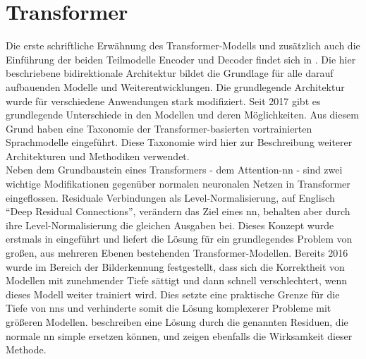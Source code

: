 \section{Transformer}\label{sec:transformer}
%
Die erste schriftliche Erwähnung des Transformer-Modells und zusätzlich auch die Einführung der beiden Teilmodelle Encoder und Decoder findet sich in \citet{attention}.
Die hier beschriebene bidirektionale Architektur bildet die Grundlage für alle darauf aufbauenden Modelle und Weiterentwicklungen.
Die grundlegende Architektur wurde für verschiedene Anwendungen stark modifiziert.
Seit 2017 gibt es grundlegende Unterschiede in den Modellen und deren Möglichkeiten.
Aus diesem Grund haben \citet{ammus} eine Taxonomie der Transformer-basierten vortrainierten Sprachmodelle eingeführt.
Diese Taxonomie wird hier zur Beschreibung weiterer Architekturen und Methodiken verwendet.\\

Neben dem Grundbaustein eines Transformers - dem Attention-\ac{nn} - sind zwei wichtige Modifikationen gegenüber normalen neuronalen Netzen in Transformer eingeflossen.
Residuale Verbindungen als Level-Normalisierung, auf Englisch \enquote{Deep Residual Connections}, verändern das Ziel eines \ac{nn}, behalten aber durch ihre Level-Normalisierung die gleichen Ausgaben bei.
Dieses Konzept wurde erstmals in \citet{deep_residual} eingeführt und liefert die Lösung für ein grundlegendes Problem von großen, aus mehreren Ebenen bestehenden Transformer-Modellen.
Bereits 2016 wurde im Bereich der Bilderkennung festgestellt, dass sich die Korrektheit von Modellen mit zunehmender Tiefe sättigt und dann schnell verschlechtert, wenn dieses Modell weiter trainiert wird.
Dies setzte eine praktische Grenze für die Tiefe von \ac{nn}s und verhinderte somit die Lösung komplexerer Probleme mit größeren Modellen.
\citet{deep_residual} beschreiben eine Lösung durch die genannten Residuen, die normale \ac{nn} simple ersetzen können, und zeigen ebenfalls die Wirksamkeit dieser Methode.\\

